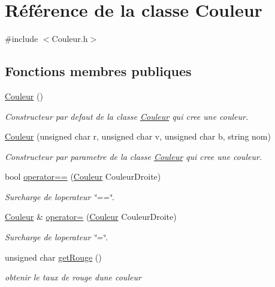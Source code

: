 \hypertarget{classCouleur}{}\section{Référence de la classe Couleur}
\label{classCouleur}


{\ttfamily \#include $<$Couleur.\+h$>$}

\subsection*{Fonctions membres publiques}
\begin{DoxyCompactItemize}
\item 
\hyperlink{classCouleur_a687a457edb08b51dbcd0299bb0b6a882}{Couleur} ()
\begin{DoxyCompactList}\small\item\em Constructeur par defaut de la classe \hyperlink{classCouleur}{Couleur} qui cree une couleur. \end{DoxyCompactList}\item 
\hyperlink{classCouleur_abde5d698dd2ba93ccd9f8fc2c672737d}{Couleur} (unsigned char r, unsigned char v, unsigned char b, string nom)
\begin{DoxyCompactList}\small\item\em Constructeur par parametre de la classe \hyperlink{classCouleur}{Couleur} qui cree une couleur. \end{DoxyCompactList}\item 
bool \hyperlink{classCouleur_a668ffa78890f16427cf7e14dd24ee2f5}{operator==} (\hyperlink{classCouleur}{Couleur} Couleur\+Droite)
\begin{DoxyCompactList}\small\item\em Surcharge de l\textquotesingle{}operateur \char`\"{}==\char`\"{}. \end{DoxyCompactList}\item 
\hyperlink{classCouleur}{Couleur} \& \hyperlink{classCouleur_a9d7642de6177a296f44ad70a8724523c}{operator=} (\hyperlink{classCouleur}{Couleur} Couleur\+Droite)
\begin{DoxyCompactList}\small\item\em Surcharge de l\textquotesingle{}operateur \char`\"{}=\char`\"{}. \end{DoxyCompactList}\item 
unsigned char \hyperlink{classCouleur_a59a0b12ab9cdbff4e2619d97e4cedb97}{get\+Rouge} ()
\begin{DoxyCompactList}\small\item\em obtenir le taux de rouge d\textquotesingle{}une couleur \end{DoxyCompactList}\item 

\end{DoxyCompactItemize}
